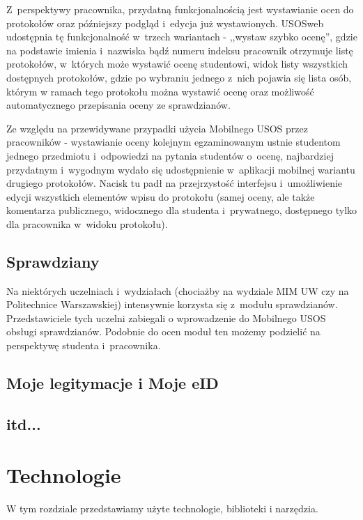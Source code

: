\documentclass{pracamgr}
\begin{document}
Z~perspektywy pracownika, przydatną funkcjonalnością jest wystawianie ocen do protokołów
oraz późniejszy podgląd i~edycja już wystawionych. USOSweb udostępnia tę funkcjonalność
w~trzech wariantach - ,,wystaw szybko ocenę'', gdzie na podstawie imienia i~nazwiska bądź
numeru indeksu pracownik otrzymuje listę protokołów, w~których może wystawić ocenę
studentowi, widok listy wszystkich dostępnych protokołów, gdzie po wybraniu jednego
z~nich pojawia się lista osób, którym w ramach tego protokołu można wystawić ocenę oraz
możliwość automatycznego przepisania oceny ze sprawdzianów.

Ze względu na przewidywane przypadki użycia Mobilnego USOS przez pracowników -
wystawianie oceny kolejnym egzaminowanym ustnie studentom jednego przedmiotu
i~odpowiedzi na pytania studentów o~ocenę, najbardziej przydatnym i~wygodnym wydało się
udostępnienie w~aplikacji mobilnej wariantu drugiego protokołów. Nacisk tu padł na
przejrzystość interfejsu i~umożliwienie edycji wszystkich elementów wpisu do protokołu
(samej oceny, ale także komentarza publicznego, widocznego dla studenta i~prywatnego,
dostępnego tylko dla pracownika w~widoku protokołu).

\section{Sprawdziany}

Na niektórych uczelniach i~wydziałach (chociażby na wydziale MIM UW czy na Politechnice
Warszawskiej) intensywnie korzysta się z~modułu sprawdzianów. Przedstawiciele tych
uczelni zabiegali o wprowadzenie do Mobilnego USOS obsługi sprawdzianów. Podobnie do ocen
moduł ten możemy podzielić na perspektywę studenta i~pracownika.

\section{Moje legitymacje i Moje eID}

\section{itd...}

\chapter{Technologie}

W tym rozdziale przedstawiamy użyte technologie, biblioteki i narzędzia.
\end{document}
